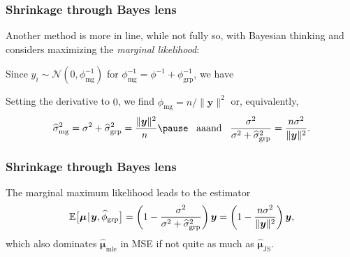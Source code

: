 \documentclass[18pt]{beamer}
\newcommand{\defineTightSpacing}{%
	\setlength{\abovedisplayskip}{.25\baselineskip}%
	\setlength{\belowdisplayskip}{.25\baselineskip}%
}
\newenvironment{tightEquation*}{%
	\defineTightSpacing%
	\begin{equation*}
}{
	\end{equation*} \ignorespacesafterend
}
\newcommand{\given}{\thinnerspace | \thinnerspace}
\newcommand{\diff}{\operatorname{\mathrm{d}}\!{}}
\newcommand{\thinnerspace}{\mskip.5\thinmuskip}
\newcommand{\expectation}{\mathbb{E}}
\newcommand{\normalDist}{\mathcal{N}}
\newcommand{\mle}[1]{\widehat{#1}_{\textrm{mle}}}
\newcommand{\js}[1]{\widehat{#1}_{\scriptscriptstyle \mathrm{JS}}}
\newcommand{\density}{\operatorname{\pi}}
\newcommand{\likelihood}{L}
\newcommand{\by}{\bm{y}}
\newcommand{\bmu}{\bm{\mu}}
\begin{document}
\begin{frame}
\frametitle{Shrinkage through Bayes lens}
Another method is more in line, while not fully so, with Bayesian thinking and considers maximizing the \textit{marginal likelihood}:

\pause
Since $y_i \sim \normalDist(0, \phi_{\mathrm{mg}}^{-1})$ for $\phi_{\mathrm{mg}}^{-1} = \phi^{-1} + \phi_{\mathrm{grp}}^{-1}$, we have
\begin{tightEquation*}
\end{tightEquation*}

\pause
\smallskip
Setting the derivative to $0$, we find $\widehat{\phi}_{\mathrm{mg}} = n / \| \by \|^2$ or, equivalently,
\begin{equation*} \defineTightSpacing%
\widehat{\sigma}_{\mathrm{mg}}^2 
	= \sigma^2 + \widehat{\sigma}_{\mathrm{grp}}^2
	= \frac{\| \by \|^2}{\!\!n} 
	\pause
	\ \, \text{ aaand } \ \,
\frac{\sigma^2}{\sigma^2 + \widehat{\sigma}_{\mathrm{grp}}^2}
	= \frac{n \sigma^2}{\| \by \|^2}.
\end{equation*}
\end{frame}


\begin{frame}
\frametitle{Shrinkage through Bayes lens}
\vspace{1.5\baselineskip}
The marginal maximum likelihood leads to the estimator
\begin{equation*} \defineTightSpacing%
\expectation\big[
	\bmu \given \by, \widehat{\phi}_{\mathrm{grp}}
\big]
	= \left( 1 - \frac{\sigma^2}{\sigma^2 + \widehat{\sigma}^2_{\mathrm{grp}}} \right) \by
	= \left( 1 - \frac{n \sigma^2}{\| \by \|^2} \right) \by,
\end{equation*}
which also dominates $\mle{\bmu}$ in {\small MSE} if not quite as much as $\js{\bmu}$.
\end{frame}
\end{document}
